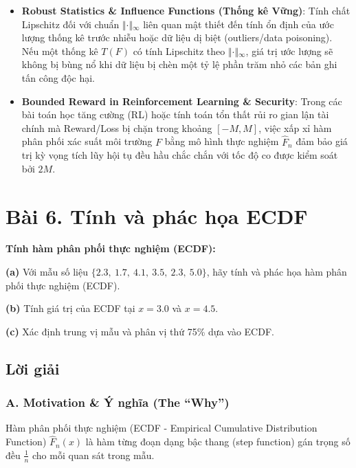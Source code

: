 \documentclass[12pt,a4paper]{article}
\begin{document}
\begin{itemize}

\item
  \textbf{Robust Statistics \& Influence Functions (Thống kê Vững)}: Tính chất Lipschitz đối với chuẩn \(\Vert{}\cdot\Vert{}_\infty\) liên quan mật thiết đến tính ổn định của ước lượng thống kê trước nhiễu hoặc dữ liệu dị biệt (outliers/data poisoning). Nếu một thống kê \(T(F)\) có tính Lipschitz theo \(\Vert{}\cdot\Vert{}_\infty\), giá trị ước lượng sẽ không bị bùng nổ khi dữ liệu bị chèn một tỷ lệ phần trăm nhỏ các bản ghi tấn công độc hại.
\item
  \textbf{Bounded Reward in Reinforcement Learning \& Security}: Trong các bài toán học tăng cường (RL) hoặc tính toán tổn thất rủi ro gian lận tài chính mà Reward/Loss bị chặn trong khoảng \([-M, M]\), việc xấp xỉ hàm phân phối xác suất môi trường \(F\) bằng mô hình thực nghiệm \(\widehat{F}_n\) đảm bảo giá trị kỳ vọng tích lũy hội tụ đều hầu chắc chắn với tốc độ co được kiểm soát bởi \(2M\).
\end{itemize}

\section{Bài 6. Tính và phác họa ECDF}\label{buxe0i-6.-tuxednh-vuxe0-phuxe1c-hux1ecda-ecdf}

\begin{debai}

\textbf{Tính hàm phân phối thực nghiệm (ECDF):}

\textbf{(a)} Với mẫu số liệu \(\{2.3,\ 1.7,\ 4.1,\ 3.5,\ 2.3,\ 5.0\}\), hãy tính và phác họa hàm phân phối thực nghiệm (ECDF).

\textbf{(b)} Tính giá trị của ECDF tại \(x = 3.0\) và \(x = 4.5\).

\textbf{(c)} Xác định trung vị mẫu và phân vị thứ 75\% dựa vào ECDF.

\end{debai}
\subsection*{Lời giải}

\subsubsection{A. Motivation \& Ý nghĩa (The ``Why'')}\label{a.-motivation-uxfd-nghux129a-the-why-5}

Hàm phân phối thực nghiệm (ECDF - Empirical Cumulative Distribution Function) \(\widehat{F}_n(x)\) là hàm từng đoạn dạng bậc thang (step function) gán trọng số đều \(\frac{1}{n}\) cho mỗi quan sát trong mẫu.
\end{document}
